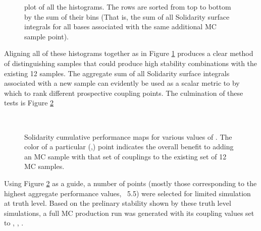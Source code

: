     \begin{figure}[tbh]
        \caption{
            plot of all the histograms.
            The rows are sorted from top to bottom by the sum of their bins
                (That is, the sum of all Solidarity surface integrals for all bases associated with the same additional MC sample point).
        }
        \label{fig:solidarity_dump}
    \end{figure}

    Aligning all of these histograms together as in Figure \ref{fig:solidarity_dump}
        produces a clear method of distinguishing samples that 
        could produce high stability combinations with the existing 12 samples.
    The aggregate sum of all Solidarity surface integrals associated with a new sample
        can evidently be used as a scalar metric to by which to rank different prospective coupling points.
    The culmination of these tests is Figure \ref{fig:solidarity_performance_map}

    \begin{figure}[tbh]
        \\
        \caption{
            Solidarity cumulative performance maps for various values of \kv.
            The color of a particular (\kvv,\kl) point indicates the overall
                benefit to adding an MC sample with that set of couplings
                to the existing set of 12 MC samples.
        }
        \label{fig:solidarity_performance_map}
    \end{figure}

    Using Figure \ref{fig:solidarity_performance_map} as a guide,
        a number of points (mostly those corresponding to the highest aggregate performance values, ~5.5)
        were selected for limited simulation at truth level.
    Based on the prelinary stability shown by these truth level simulations,
        a full MC production run was generated with its coupling values set to , , .
